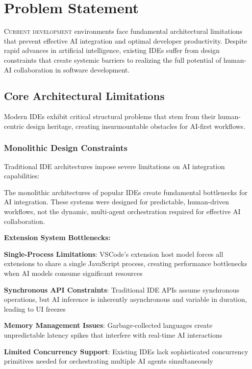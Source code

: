 
\section{Problem Statement}
\label{sec:problem-statement}

\lettrine{C}{urrent development} environments face fundamental architectural limitations that prevent effective AI integration and optimal developer productivity. Despite rapid advances in artificial intelligence, existing IDEs suffer from design constraints that create systemic barriers to realizing the full potential of human-AI collaboration in software development.

\subsection{Core Architectural Limitations}
\label{subsec:core-limitations}

Modern IDEs exhibit critical structural problems that stem from their human-centric design heritage, creating insurmountable obstacles for AI-first workflows.

\subsubsection{Monolithic Design Constraints}

Traditional IDE architectures impose severe limitations on AI integration capabilities:

\begin{alertbox}
The monolithic architectures of popular IDEs create fundamental bottlenecks for AI integration. These systems were designed for predictable, human-driven workflows, not the dynamic, multi-agent orchestration required for effective AI collaboration.
\end{alertbox}

\textbf{Extension System Bottlenecks:}

\begin{expandedlist}
    \item \textbf{Single-Process Limitations}: VSCode's extension host model forces all extensions to share a single JavaScript process, creating performance bottlenecks when AI models consume significant resources
    
    \item \textbf{Synchronous API Constraints}: Traditional IDE APIs assume synchronous operations, but AI inference is inherently asynchronous and variable in duration, leading to UI freezes
    
    \item \textbf{Memory Management Issues}: Garbage-collected languages create unpredictable latency spikes that interfere with real-time AI interactions
    
    \item \textbf{Limited Concurrency Support}: Existing IDEs lack sophisticated concurrency primitives needed for orchestrating multiple AI agents simultaneously
\end{expandedlist}

